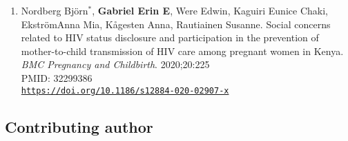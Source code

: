 \documentclass[12pt]{article}
\providecommand \url[1]{\href{#1}{#1}}
\renewcommand*\url[1]{\href{#1}{\texttt{#1}}}
\begin{document}
\begin{enumerate}
\item Nordberg Björn$^*$, \textbf{Gabriel Erin E}, Were Edwin,  Kaguiri Eunice Chaki, EkströmAnna Mia, Kågesten Anna, Rautiainen Susanne. Social concerns related to HIV status disclosure and participation in the prevention of mother-to-child transmission of HIV care among pregnant women in Kenya. \emph{BMC Pregnancy and Childbirth}. 2020;20:225\\
PMID: 32299386\\
\url{https://doi.org/10.1186/s12884-020-02907-x}
\end{enumerate}



\subsection*{Contributing author}
\end{document}
